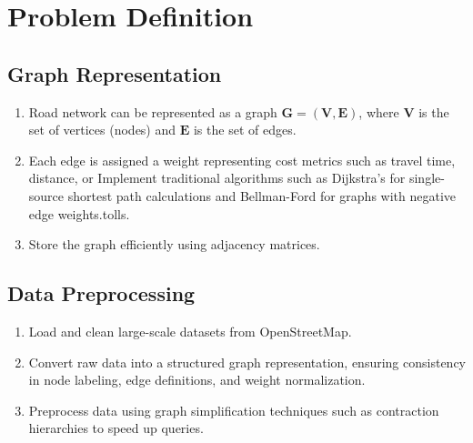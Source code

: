 \chapter{Problem Definition}




\section*{Graph Representation}

\begin{enumerate}
	\item Road network can be represented as a graph \( \mathbf{G} = (\mathbf{V}, \mathbf{E}) \), where \( \mathbf{V} \) is the set of vertices (nodes) and \( \mathbf{E} \) is the set of edges.
	\item Each edge is assigned a weight representing cost metrics such as travel time, distance, or Implement traditional algorithms such as Dijkstra’s for single-source shortest path calculations and Bellman-Ford for graphs with negative edge weights.tolls. 
	\item Store the graph efficiently using adjacency matrices.
\end{enumerate}

\section*{Data Preprocessing}
\begin{enumerate}
	
	\item Load and clean large-scale datasets from OpenStreetMap.
	\item  Convert raw data into a structured graph representation, ensuring consistency in node labeling, edge definitions, and weight normalization. 
	\item Preprocess data using graph simplification techniques such as contraction hierarchies to speed up queries.
	
\end{enumerate}

